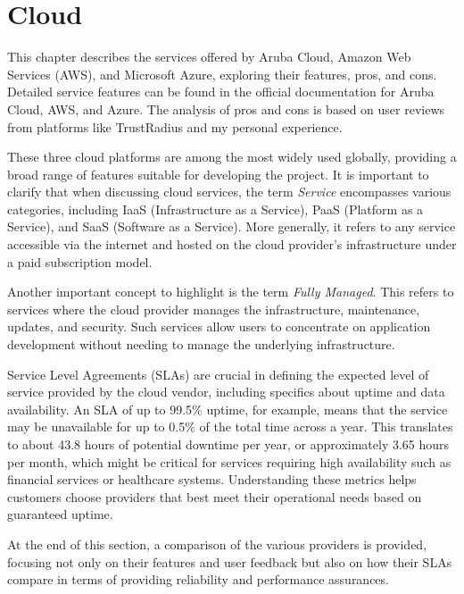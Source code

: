 \chapter{Cloud}
\label{cap:cloud}
This chapter describes the services offered by Aruba Cloud, Amazon Web Services (AWS), and Microsoft Azure, exploring their features, pros, and cons. Detailed service features can be found in the official documentation for Aruba Cloud\cite{site:aruba-docs}, AWS\cite{site:aws-docs}, and Azure\cite{site:azure-docs}. The analysis of pros and cons is based on user reviews from platforms like TrustRadius\cite{site:trust-radius} and my personal experience.

These three cloud platforms are among the most widely used globally, providing a broad range of features suitable for developing the project. It is important to clarify that when discussing cloud services, the term \textit{Service} encompasses various categories, including IaaS (Infrastructure as a Service), PaaS (Platform as a Service), and SaaS (Software as a Service). More generally, it refers to any service accessible via the internet and hosted on the cloud provider's infrastructure under a paid subscription model.

Another important concept to highlight is the term \textit{Fully Managed}. This refers to services where the cloud provider manages the infrastructure, maintenance, updates, and security. Such services allow users to concentrate on application development without needing to manage the underlying infrastructure.

Service Level Agreements (SLAs) are crucial in defining the expected level of service provided by the cloud vendor, including specifics about uptime and data availability. An SLA of up to 99.5\% uptime, for example, means that the service may be unavailable for up to 0.5\% of the total time across a year. This translates to about 43.8 hours of potential downtime per year, or approximately 3.65 hours per month, which might be critical for services requiring high availability such as financial services or healthcare systems. Understanding these metrics helps customers choose providers that best meet their operational needs based on guaranteed uptime.

At the end of this section, a comparison of the various providers is provided, focusing not only on their features and user feedback but also on how their SLAs compare in terms of providing reliability and performance assurances.



